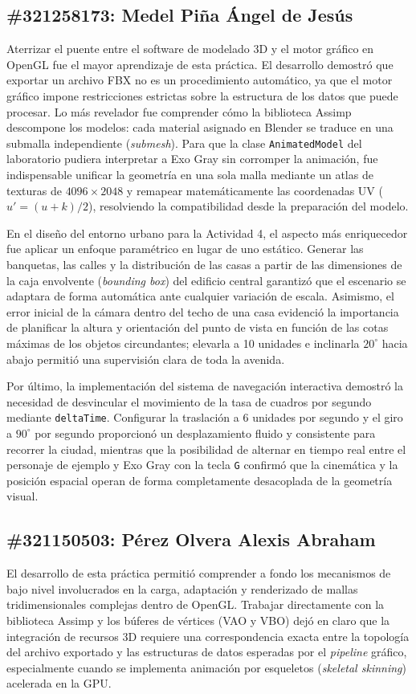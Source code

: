 \subsection*{\#321258173: Medel Piña Ángel de Jesús}
Aterrizar el puente entre el software de modelado 3D y el motor gráfico en OpenGL fue el mayor aprendizaje de esta práctica. El desarrollo demostró que exportar un archivo FBX no es un procedimiento automático, ya que el motor gráfico impone restricciones estrictas sobre la estructura de los datos que puede procesar. Lo más revelador fue comprender cómo la biblioteca Assimp descompone los modelos: cada material asignado en Blender se traduce en una submalla independiente (\textit{submesh}). Para que la clase \texttt{AnimatedModel} del laboratorio pudiera interpretar a Exo Gray sin corromper la animación, fue indispensable unificar la geometría en una sola malla mediante un atlas de texturas de $4096 \times 2048$ y remapear matemáticamente las coordenadas UV ($u' = (u+k)/2$), resolviendo la compatibilidad desde la preparación del modelo.

En el diseño del entorno urbano para la Actividad 4, el aspecto más enriquecedor fue aplicar un enfoque paramétrico en lugar de uno estático. Generar las banquetas, las calles y la distribución de las casas a partir de las dimensiones de la caja envolvente (\textit{bounding box}) del edificio central garantizó que el escenario se adaptara de forma automática ante cualquier variación de escala. Asimismo, el error inicial de la cámara dentro del techo de una casa evidenció la importancia de planificar la altura y orientación del punto de vista en función de las cotas máximas de los objetos circundantes; elevarla a 10 unidades e inclinarla $20^\circ$ hacia abajo permitió una supervisión clara de toda la avenida.

Por último, la implementación del sistema de navegación interactiva demostró la necesidad de desvincular el movimiento de la tasa de cuadros por segundo mediante \texttt{deltaTime}. Configurar la traslación a 6 unidades por segundo y el giro a $90^\circ$ por segundo proporcionó un desplazamiento fluido y consistente para recorrer la ciudad, mientras que la posibilidad de alternar en tiempo real entre el personaje de ejemplo y Exo Gray con la tecla \texttt{G} confirmó que la cinemática y la posición espacial operan de forma completamente desacoplada de la geometría visual.

\subsection*{\#321150503: Pérez Olvera Alexis Abraham}
El desarrollo de esta práctica permitió comprender a fondo los mecanismos de bajo nivel involucrados en la carga, adaptación y renderizado de mallas tridimensionales complejas dentro de OpenGL. Trabajar directamente con la biblioteca Assimp y los búferes de vértices (VAO y VBO) dejó en claro que la integración de recursos 3D requiere una correspondencia exacta entre la topología del archivo exportado y las estructuras de datos esperadas por el \textit{pipeline} gráfico, especialmente cuando se implementa animación por esqueletos (\textit{skeletal skinning}) acelerada en la GPU.

